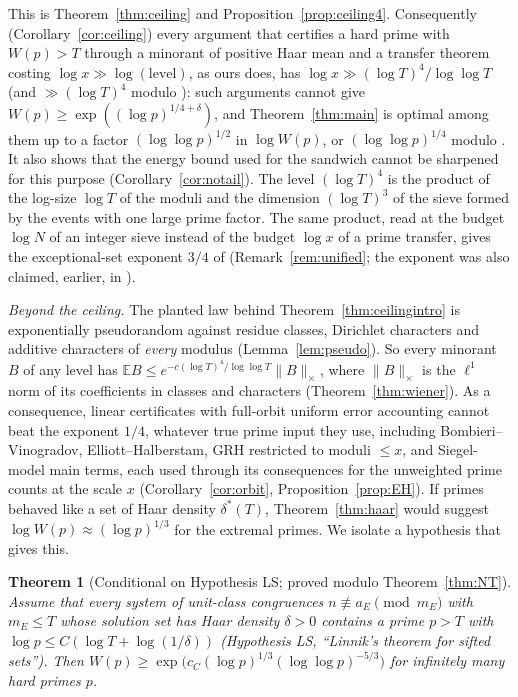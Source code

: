 \documentclass[11pt,reqno]{amsart}
\newtheorem{theorem}{Theorem}[section]
\theoremstyle{definition}
\newcommand{\E}{\mathbb E}
\begin{document}
This is Theorem~\ref{thm:ceiling} and Proposition~\ref{prop:ceiling4}.
Consequently (Corollary~\ref{cor:ceiling}) every argument that certifies a
hard prime with $W(p)>T$ through a minorant of positive Haar mean and a
transfer theorem costing $\log x\gg\log(\text{level})$, as ours does, has
$\log x\gg(\log T)^4/\log\log T$ (and $\gg(\log T)^4$ modulo \cite{TQ}): such
arguments cannot give $W(p)\ge\exp((\log p)^{1/4+\delta})$, and
Theorem~\ref{thm:main} is optimal among them up to a factor
$(\log\log p)^{1/2}$ in $\log W(p)$, or $(\log\log p)^{1/4}$ modulo \cite{TQ}.  It
also shows that the energy bound used for the sandwich cannot be sharpened
for this purpose (Corollary~\ref{cor:notail}).  The level $(\log T)^4$ is the
product of the log-size $\log T$ of the moduli and the dimension $(\log T)^3$ of
the sieve formed by the events with one large prime factor.  The same
product, read at the budget $\log N$ of an integer sieve instead of the
budget $\log x$ of a prime transfer, gives the exceptional-set exponent $3/4$
of \cite{TQ} (Remark~\ref{rem:unified}; the exponent was also claimed,
earlier, in \cite{KRK}).

\emph{Beyond the ceiling.}  The planted law behind
Theorem~\ref{thm:ceilingintro} is exponentially pseudorandom against
residue classes, Dirichlet characters and additive characters of
\emph{every} modulus (Lemma~\ref{lem:pseudo}).  So every minorant $B$ of any
level has $\E B\le e^{-c(\log T)^4/\log\log T}\|B\|_\times$, where $\|B\|_\times$ is the $\ell^1$
norm of its coefficients in classes and characters
(Theorem~\ref{thm:wiener}).  As a consequence, linear certificates with
full-orbit uniform error accounting cannot beat the exponent $1/4$, whatever
true prime input they use, including Bombieri--Vinogradov,
Elliott--Halberstam, GRH restricted to moduli $\le x$, and Siegel-model main
terms, each used through its consequences for the unweighted prime counts
at the scale $x$ (Corollary~\ref{cor:orbit}, Proposition~\ref{prop:EH}).  If primes
behaved like a set of Haar density $\delta^*(T)$, Theorem~\ref{thm:haar} would
suggest $\log W(p)\approx(\log p)^{1/3}$ for the extremal primes.  We isolate a
hypothesis that gives this.

\begin{theorem}[Conditional on Hypothesis LS; proved modulo Theorem~\ref{thm:NT}]\label{thm:LSintro}
Assume that every system of unit-class congruences $n\not\equiv a_E\pmod{m_E}$ with
$m_E\le T$ whose solution set has Haar density $\delta>0$ contains a prime $p>T$
with $\log p\le C(\log T+\log(1/\delta))$ (Hypothesis LS, ``Linnik's theorem for
sifted sets'').  Then $W(p)\ge\exp\big(c_C(\log p)^{1/3}(\log\log p)^{-5/3}\big)$ for
infinitely many hard primes $p$.
\end{theorem}
\end{document}
